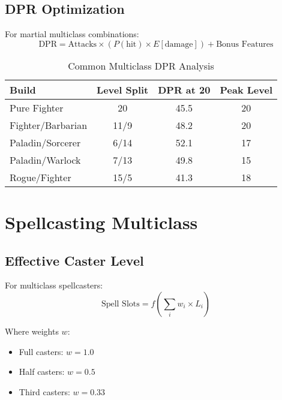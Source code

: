 \documentclass[11pt,letterpaper,openany]{book}
\begin{document}
\subsection{DPR Optimization}

For martial multiclass combinations:
\begin{equation}
\text{DPR} = \text{Attacks} \times (P(\text{hit}) \times E[\text{damage}]) + \text{Bonus Features}
\end{equation}

\begin{table}[h]
\centering
\begin{tabular}{@{}lccc@{}}
\toprule
\textbf{Build} & \textbf{Level Split} & \textbf{DPR at 20} & \textbf{Peak Level} \\
\midrule
Pure Fighter & 20 & 45.5 & 20 \\
Fighter/Barbarian & 11/9 & 48.2 & 20 \\
Paladin/Sorcerer & 6/14 & 52.1 & 17 \\
Paladin/Warlock & 7/13 & 49.8 & 15 \\
Rogue/Fighter & 15/5 & 41.3 & 18 \\
\bottomrule
\end{tabular}
\caption{Common Multiclass DPR Analysis}
\end{table}

\section{Spellcasting Multiclass}

\subsection{Effective Caster Level}

For multiclass spellcasters:
\begin{equation}
\text{Spell Slots} = f\left(\sum_{i} w_i \times L_i\right)
\end{equation}

Where weights $w$:
\begin{itemize}
    \item Full casters: $w = 1.0$
    \item Half casters: $w = 0.5$
    \item Third casters: $w = 0.33$
\end{itemize}
\end{document}
